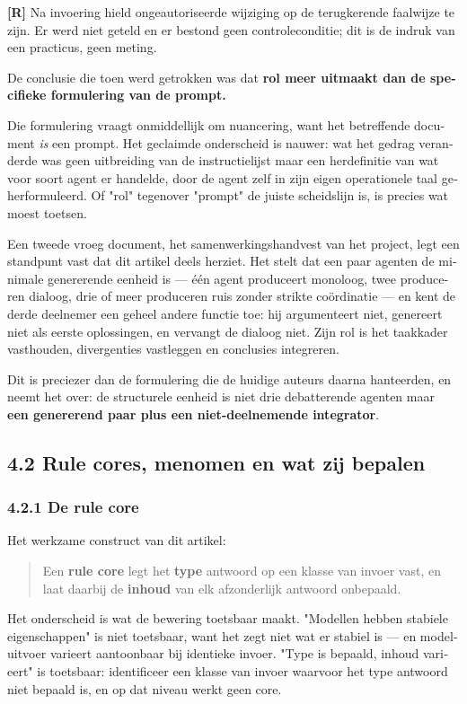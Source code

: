\begin{dutch}
\textbf{[R]} Na invoering hield ongeautoriseerde wijziging op de terugkerende faalwijze te zijn. Er werd niet geteld en er bestond geen controleconditie; dit is de indruk van een practicus, geen meting.

De conclusie die toen werd getrokken was dat \textbf{rol meer uitmaakt dan de specifieke formulering van de prompt.}

Die formulering vraagt onmiddellijk om nuancering, want het betreffende document \emph{is} een prompt. Het geclaimde onderscheid is nauwer: wat het gedrag veranderde was geen uitbreiding van de instructielijst maar een herdefinitie van wat voor soort agent er handelde, door de agent zelf in zijn eigen operationele taal geherformuleerd. Of "rol" tegenover "prompt" de juiste scheidslijn is, is precies wat  moest toetsen.

Een tweede vroeg document, het samenwerkingshandvest van het project, legt een standpunt vast dat dit artikel deels herziet. Het stelt dat een paar agenten de minimale genererende eenheid is — één agent produceert monoloog, twee produceren dialoog, drie of meer produceren ruis zonder strikte coördinatie — en kent de derde deelnemer een geheel andere functie toe: hij argumenteert niet, genereert niet als eerste oplossingen, en vervangt de dialoog niet. Zijn rol is het taakkader vasthouden, divergenties vastleggen en conclusies integreren.

Dit is preciezer dan de formulering die de huidige auteurs daarna hanteerden, en  neemt het over: de structurele eenheid is niet drie debatterende agenten maar \textbf{een genererend paar plus een niet-deelnemende integrator}.


\subsection*{4.2 Rule cores, menomen en wat zij bepalen}
\label{sec:nl:4.2}


\subsubsection*{4.2.1 De rule core}
\label{sec:nl:4.2.1}

Het werkzame construct van dit artikel:

\begin{quote}
Een \textbf{rule core} legt het \textbf{type} antwoord op een klasse van invoer vast, en laat daarbij de \textbf{inhoud} van elk afzonderlijk antwoord onbepaald.
\end{quote}
Het onderscheid is wat de bewering toetsbaar maakt. "Modellen hebben stabiele eigenschappen" is niet toetsbaar, want het zegt niet wat er stabiel is — en modeluitvoer varieert aantoonbaar bij identieke invoer. "Type is bepaald, inhoud varieert" is toetsbaar: identificeer een klasse van invoer waarvoor het type antwoord niet bepaald is, en op dat niveau werkt geen core.


\end{dutch}
